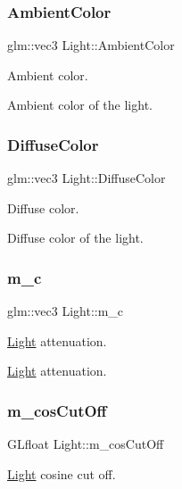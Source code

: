 \subsubsection{\texorpdfstring{Ambient\+Color}{AmbientColor}}
{\footnotesize\ttfamily glm\+::vec3 Light\+::\+Ambient\+Color}



Ambient color. 

Ambient color of the light. \mbox{\label{class_light_ab3885005f09ec9411cc1f31c069dc7d9}} 
\subsubsection{\texorpdfstring{Diffuse\+Color}{DiffuseColor}}
{\footnotesize\ttfamily glm\+::vec3 Light\+::\+Diffuse\+Color}



Diffuse color. 

Diffuse color of the light. \mbox{\label{class_light_a31a4d7e3042d7ffe99e3070bcaa6aa61}} 
\subsubsection{\texorpdfstring{m\+\_\+c}{m\_c}}
{\footnotesize\ttfamily glm\+::vec3 Light\+::m\+\_\+c\hspace{0.3cm}{\ttfamily [protected]}}



\hyperlink{class_light}{Light} attenuation. 

\hyperlink{class_light}{Light} attenuation. \mbox{\label{class_light_a5f99e10dc1c5c49785c4523d09588eef}} 
\subsubsection{\texorpdfstring{m\+\_\+cos\+Cut\+Off}{m\_cosCutOff}}
{\footnotesize\ttfamily G\+Lfloat Light\+::m\+\_\+cos\+Cut\+Off\hspace{0.3cm}{\ttfamily [protected]}}



\hyperlink{class_light}{Light} cosine cut off. 

